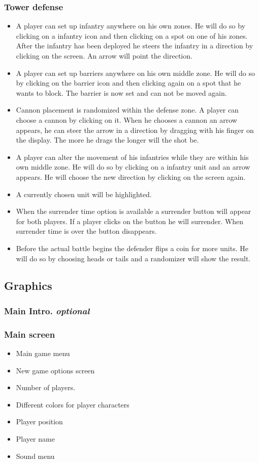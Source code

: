 \documentclass[12pt,a4paper]{article}
\begin{document}
\subsubsection{Tower defense}
\begin{itemize}
\item A player can set up infantry anywhere on his own zones. He will
  do so by clicking on a infantry icon and then clicking on a spot on
  one of his zones. After the infantry has been deployed he steers the
  infantry in a direction by clicking on the screen. An arrow will
  point the direction.
\item A player can set up barriers anywhere on his own middle zone. He
  will do so by clicking on the barrier icon and then clicking again
  on a spot that he wants to block. The barrier is now set and can not
  be moved again.
\item Cannon placement is randomized within the defense zone. A player
  can choose a cannon by clicking on it. When he chooses a cannon an
  arrow appears, he can steer the arrow in a direction by dragging
  with his finger on the display. The more he drags the longer will
  the shot be.
\item A player can alter the movement of his infantries while they are
  within his own middle zone. He will do so by clicking on a infantry
  unit and an arrow appears. He will choose the new direction by
  clicking on the screen again.
\item A currently chosen unit will be highlighted.
\item When the surrender time option is available a surrender button
  will appear for both players. If a player clicks on the button he
  will surrender. When surrender time is over the button disappears.
\item Before the actual battle begins the defender flips a coin for
  more units. He will do so by choosing heads or tails and a
  randomizer will show the result.
\end{itemize}

\subsection{Graphics}

\subsubsection{Main Intro. \emph{optional}}

\subsubsection{Main screen}
\begin{itemize}
\item Main game menu
\item New game options screen
\item Number of players.
\item Different colors for player characters
\item Player position
\item Player name
\item Sound menu
\end{itemize}
\end{document}

